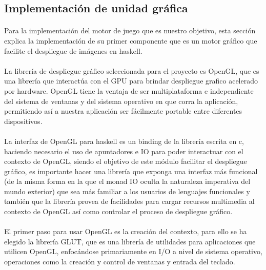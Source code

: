 \documentclass{standalone}
\begin{document}
\subsection{Implementación de unidad gráfica}

\paragraph{}
Para la implementación del motor de juego que es nuestro objetivo, esta sección explica la implementación de su primer componente que es un motor gráfico que facilite el despliegue de imágenes en haskell.

\paragraph{}
La librería de despliegue gráfico seleccionada para el proyecto es OpenGL, que es una librería que interactúa con el GPU para brindar despliegue grafico acelerado por hardware. OpenGL tiene la ventaja de ser multiplataforma e independiente del sistema de ventanas y del sistema operativo en que corra la aplicación, permitiendo así a nuestra aplicación ser fácilmente portable entre diferentes dispositivos.

\paragraph{}
La interfaz de OpenGL para haskell es un binding de la librería escrita en c, haciendo necesario el uso de apuntadores e IO para poder interactuar con el contexto de OpenGL, siendo el objetivo de este módulo facilitar el despliegue gráfico, es importante hacer una librería que exponga una interfaz más funcional (de la misma forma en la que el monad IO oculta la naturaleza imperativa del mundo exterior) que sea más familiar a los usuarios de lenguajes funcionales y también que la librería provea de facilidades para cargar recursos multimedia al contexto de OpenGL así como controlar el proceso de despliegue gráfico.

\paragraph{}
El primer paso para usar OpenGL es la creación del contexto, para ello se ha elegido la librería GLUT, que es una librería de utilidades para aplicaciones que utilicen OpenGL, enfocándose primariamente en I/O a nivel de sistema operativo, operaciones como la creación y control de ventanas y entrada del teclado.
\end{document}
